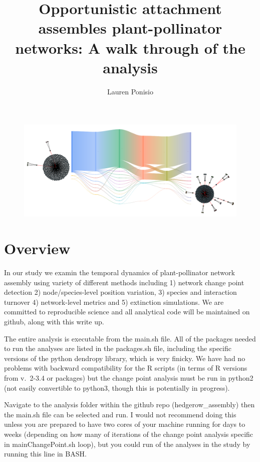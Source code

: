 \documentclass{article}\usepackage[]{graphicx}\usepackage[]{color}
\begin{document}
\title{Opportunistic attachment assembles plant-pollinator networks: A walk through of the analysis}
\author{Lauren Ponisio}

\maketitle

\begin{figure}[h!]
  \centering
  \includegraphics[width=1.1\textwidth]{figure/SankeyIDb303b2e99ce.pdf}
  \label{fig:methods}
\end{figure}
\clearpage

\section{Overview}
\label{sec:overview}

In our study we examin the temporal dynamics of plant-pollinator
network assembly using variety of different methods including 1) network
change point detection 2) node/species-level position variation, 3)
species and interaction turnover 4) network-level metrics and 5)
extinction simulations. We are committed to reproducible science and
all analytical code will be maintained on github, along with this
write up.

The entire analysis is executable from the main.sh file. All of the
packages needed to run the analyses are listed in the packages.sh
file, including the specific versions of the python dendropy library,
which is very finicky. We have had no problems with backward
compatibility for the R scripts (in terms of R versions from v.~2-3.4
or packages) but the change point analysis must be run in python2 (not
easily convertible to python3, though this is potentially in
progress).

Navigate to the analysis folder within the github repo
(hedgerow\_assembly) then the main.sh file can be selected and
run. I would not recommend doing this unless you are prepared to have two
cores of your machine running for days to weeks (depending on how many
of iterations of the change point analysis specific in
mainChangePoint.sh loop), but you could run of the analyses in the
study by running this line in BASH.
\end{document}

